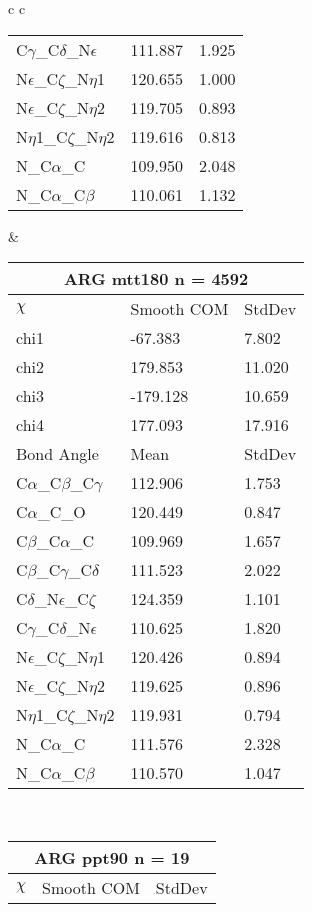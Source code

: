 \begin{longtable}{ c c }
\begin{tabular}{ l l l }
  C$\gamma$\_C$\delta$\_N$\epsilon$ & 111.887 & 1.925\\
  N$\epsilon$\_C$\zeta$\_N$\eta$1 & 120.655 & 1.000\\
  N$\epsilon$\_C$\zeta$\_N$\eta$2 & 119.705 & 0.893\\
  N$\eta$1\_C$\zeta$\_N$\eta$2 & 119.616 & 0.813\\
  N\_C$\alpha$\_C & 109.950 & 2.048\\
  N\_C$\alpha$\_C$\beta$ & 110.061 & 1.132\\
  \bottomrule
  \end{tabular}
  &
  \begin{tabular}{ l l l }
  \toprule
  \multicolumn{3}{c}{ARG \textbf{mtt180} n = 4592} \\ \toprule
  $\chi$       & Smooth COM & StdDev \\ \midrule
  chi1 & -67.383 & 7.802 \\ 
  chi2 & 179.853 & 11.020 \\ 
  chi3 & -179.128 & 10.659 \\ 
  chi4 & 177.093 & 17.916 \\ \midrule
  Bond Angle   & Mean     & StdDev \\ \midrule
  C$\alpha$\_C$\beta$\_C$\gamma$ & 112.906 & 1.753\\
  C$\alpha$\_C\_O & 120.449 & 0.847\\
  C$\beta$\_C$\alpha$\_C & 109.969 & 1.657\\
  C$\beta$\_C$\gamma$\_C$\delta$ & 111.523 & 2.022\\
  C$\delta$\_N$\epsilon$\_C$\zeta$ & 124.359 & 1.101\\
  C$\gamma$\_C$\delta$\_N$\epsilon$ & 110.625 & 1.820\\
  N$\epsilon$\_C$\zeta$\_N$\eta$1 & 120.426 & 0.894\\
  N$\epsilon$\_C$\zeta$\_N$\eta$2 & 119.625 & 0.896\\
  N$\eta$1\_C$\zeta$\_N$\eta$2 & 119.931 & 0.794\\
  N\_C$\alpha$\_C & 111.576 & 2.328\\
  N\_C$\alpha$\_C$\beta$ & 110.570 & 1.047\\
  \bottomrule
  \end{tabular}
  \\
  \begin{tabular}{ l l l }
  \toprule
  \multicolumn{3}{c}{ARG \textbf{ppt90} n = 19} \\ \toprule
  $\chi$       & Smooth COM & StdDev \\ \midrule

\end{tabular}
\end{longtable}
